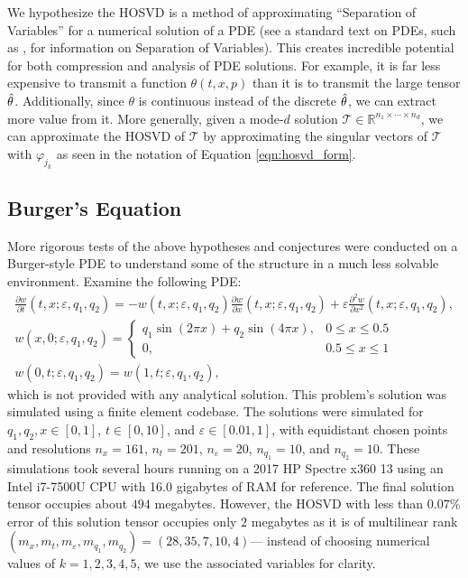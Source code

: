 \documentclass[12pt]{article}
\newcommand{\R}{\mathbb{R}}
\newcommand{\eps}{\varepsilon}
\begin{document}
    We hypothesize the HOSVD is a method of approximating ``Separation of Variables'' for a numerical solution of a PDE (see a standard text on PDEs, such as \cite{pdes}, for information on Separation of Variables). This creates incredible potential for both compression and analysis of PDE solutions. For example, it is far less expensive to transmit a function $\theta(t,x,p)$ than it is to transmit the large tensor $\Hat{\theta}$. Additionally, since $\theta$ is continuous instead of the discrete $\Hat{\theta}$, we can extract more value from it. More generally, given a mode-$d$ solution $\mathscr{T}\in\R^{n_1\times\cdots\times n_d}$, we can approximate the HOSVD of $\mathscr{T}$ by approximating the singular vectors of $\mathscr{T}$ with $\varphi_{j_k}$ as seen in the notation of Equation \ref{eqn:hosvd_form}.

    \subsection{Burger's Equation}
    
    More rigorous tests of the above hypotheses and conjectures were conducted on a Burger-style PDE to understand some of the structure in a much less solvable environment. Examine the following PDE:
    \begin{align}\label{eqn:burger_def}
        \frac{\partial w}{\partial t}(t,x;\eps,q_1,q_2) = -w(t,x;\eps,q_1,q_2)\frac{\partial w}{\partial x}(t,x;\eps,q_1,q_2) + \eps \frac{\partial^2 w}{\partial x^2}(t,x;\eps,q_1,q_2),\\
        w(x,0;\eps,q_1,q_2) = \begin{cases} q_1\sin(2\pi x)+q_2\sin(4\pi x),&0\leq x\leq 0.5\\0, & 0.5\leq x\leq 1\end{cases} \nonumber\\
        w(0,t;\eps,q_1,q_2)=w(1,t;\eps,q_1,q_2) \nonumber,
    \end{align}
    which is not provided with any analytical solution. This problem's solution was simulated using a finite element codebase. The solutions were simulated for $q_1,q_2,x\in[0,1]$, $t\in[0,10]$, and $\eps\in[0.01,1]$, with equidistant chosen points and resolutions $n_x = 161$, $n_t=201$, $n_\eps = 20$, $n_{q_1} = 10$, and $n_{q_2}=10$. These simulations took several hours running on a 2017 HP Spectre x360 13 using an Intel i7-7500U CPU with 16.0 gigabytes of RAM for reference. The final solution tensor occupies about $494$ megabytes. However, the HOSVD with less than $0.07\%$ error of this solution tensor occupies only $2$ megabytes as it is of multilinear rank $(m_x,m_t,m_\eps,m_{q_1},m_{q_2}) = (28,35,7,10,4)$--- instead of choosing numerical values of $k=1,2,3,4,5$, we use the associated variables for clarity.
\end{document}
